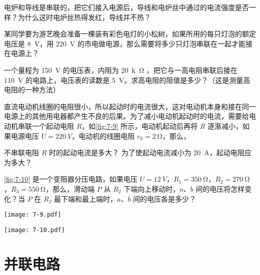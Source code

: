 \begin{Practice}
\begin{question}
  \item 电炉和导线是串联的，把它们接入电源后，导线和电炉丝中通过的电流强度是否一样？为什么这时电炉丝热得发红，导线并不热？
  \item 某同学要为游艺晚会准备一棵装有彩色电灯的小松树，如果所用的每只灯泡的额定电压是 \qty{8}{V}，用 \qty{220}{V} 的市电做电源，那么需要将多少只灯泡串联在一起才能接在电源上？
  \item 一个量程为 \qty{150}{V} 的电压表，内阻为 \qty{20}{k\ohm} ，把它与一高电阻串联后接在 \qty{110}{V} 的电路上，电压表的读数是 \qty{5}{V}。求高电阻的阻值是多少？（这是测量高电阻的一种方法）
  \item 直流电动机线圈的电阻很小，所以起动时的电流很大，这对电动机本身和接在同一电源上的其他用电器都产生不良的后果。为了减小电动机起动时的电流，需要给电动机串联一个起动电阻 $R$，如\cref{fig:7-9} 所示，电动机起动后再将 $R$ 逐渐减小，如果电源电压 $U=\qty{220}{V}$，电动机的线圈电阻 $r_0=\qty{2}{\ohm}$，那么，
  \begin{tasks}
    \task 不串联电阻 $R$ 时的起动电流是多大？
    \task 为了使起动电流减小为 \qty{20}{A}，起动电阻应为多大？
  \end{tasks}
  \item \cref{fig:7-10} 是一个变阻器分压电路，如果电压 $U=\qty{12}{V}$，$R_1=\qty{350}{\ohm}$，$R_2=\qty{270}{\ohm}$，$R_3=\qty{550}{\ohm}$，那么，滑动端 $P$ 从 $R_2$ 下端向上移动时，$a$、$b$ 间的电压将怎样变化？当 $P$ 在 $R_2$ 最下端和最上端时，$a$、$b$ 间的电压各是多少？	
  \begin{figurehere}
    \begin{minipage}{\linewidth}
      \begin{minipage}[b]{0.52\linewidth}\centering
        \texttt{[image: 7-9.pdf]}
        \caption{}\label{fig:7-9}
      \end{minipage}
      \begin{minipage}[b]{0.45\linewidth}\centering
        \texttt{[image: 7-10.pdf]}
        \caption{}\label{fig:7-10}
      \end{minipage}
    \end{minipage}
  \end{figurehere}
\end{question}
\end{Practice}

\section{并联电路}
